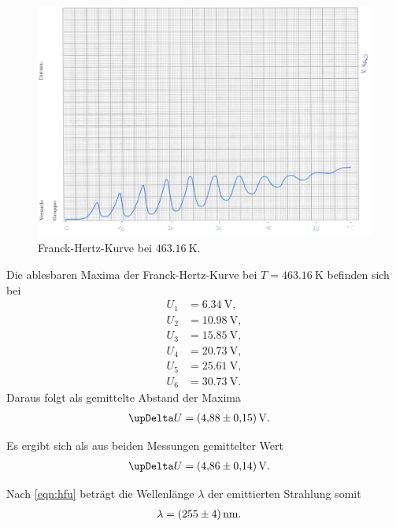 \begin{figure}[H]
	\centering
	\includegraphics[width=0.7\linewidth]{data/Franck-Hertz190C.png}
	\caption{Franck-Hertz-Kurve bei $\SI{463,16}{\kelvin}$.}
	\label{fig:fh190}
\end{figure}
\noindent
Die ablesbaren Maxima der Franck-Hertz-Kurve bei $T = \SI{463,16}{\kelvin}$ befinden sich bei
\begin{align*}
  U_1 &= \SI{6,34}{\volt}, \\
  U_2 &= \SI{10,98}{\volt}, \\
  U_3 &= \SI{15,85}{\volt},\\
  U_4 &= \SI{20,73}{\volt},\\
  U_5 &= \SI{25,61}{\volt},\\
  U_6 &= \SI{30,73}{\volt}.
\end{align*}
\noindent
Daraus folgt als gemittelte Abstand der Maxima
\begin{align*}
  \upDelta U &= \SI{4,88 \pm 0,15}{\volt}.
\end{align*}

\noindent
Es ergibt sich als aus beiden Messungen gemittelter Wert
\begin{align*}
  \upDelta U &= \SI{4,86 \pm 0,14}{\volt}.
\end{align*}

\noindent
Nach \autoref{eqn:hfu} beträgt die Wellenlänge $\lambda$ der emittierten Strahlung somit
\begin{align*}
  \lambda &= \SI{255+-4}{\nano\metre}.
\end{align*}